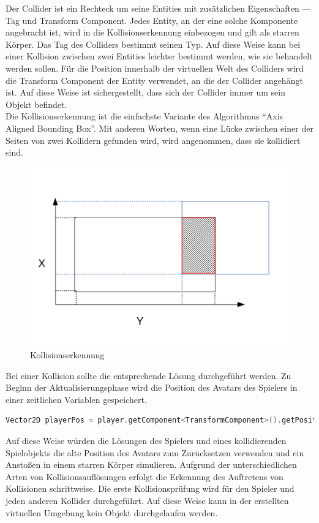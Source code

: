 \documentclass[
  10pt,
  a4paper,
  oneside,
  headers,
  headinclude,
  footinclude,
  BCOR5mm,
]{article}
\begin{document}
Der Collider ist ein Rechteck um seine Entities mit zusätzlichen Eigenschaften
--- Tag und Transform Component. Jedes Entity, an der eine solche Komponente
angebracht ist, wird in die Kollisionserkennung einbezogen und gilt als starren
Körper. Das Tag des Colliders bestimmt seinen Typ. Auf diese Weise kann bei
einer Kollision zwischen zwei Entities leichter bestimmt werden, wie sie
behandelt werden sollen. Für die Position innerhalb der virtuellen Welt des
Colliders wird die Transform Component der Entity verwendet, an die der Collider
angehängt ist. Auf diese Weise ist sichergestellt, dass sich der Collider immer
um sein Objekt befindet. \\
Die Kollisionserkennung ist die einfachste Variante des Algorithmus ``Axis
Aligned Bounding Box''. Mit anderen Worten, wenn eine Lücke zwischen einer der
Seiten von zwei Kollidern gefunden wird, wird angenommen, dass sie kollidiert
sind.

\begin{figure}[h]
  \centering
  \includegraphics[scale=0.75]{AABB_Collision}
  \caption{Kollisionserkennung}
  \label{fig:Kollisionserkennung}
\end{figure}

Bei einer Kollision sollte die entsprechende Lösung durchgeführt werden. Zu
Beginn der Aktualisierungsphase wird die Position des Avatars des Spielers in
einer zeitlichen Variablen gespeichert.

\begin{lstlisting}[language=C++]
Vector2D playerPos = player.getComponent<TransformComponent>().getPosition();
\end{lstlisting}

Auf diese Weise würden die Lösungen des Spielers und eines kollidierenden
Spielobjekts die alte Position des Avatars zum Zurücksetzen verwenden und ein
Anstoßen in einem starren Körper simulieren. Aufgrund der unterschiedlichen
Arten von Kollisionsauflösungen erfolgt die Erkennung des Auftretens von
Kollisionen schrittweise. Die erste Kollisionsprüfung wird für den Spieler und
jeden anderen Kollider durchgeführt. Auf diese Weise kann in der erstellten
virtuellen Umgebung kein Objekt durchgelaufen werden.
\end{document}
